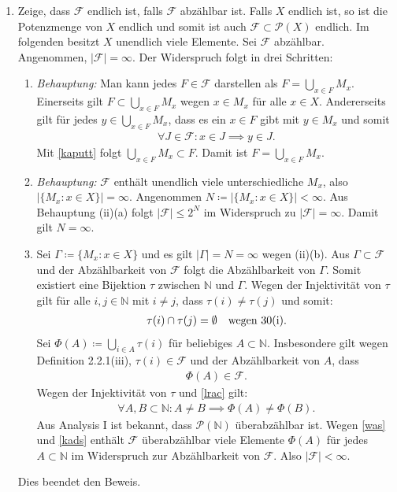 \documentclass[a4paper,DIV=1]{article}
\theoremstyle{plain}
\begin{document}
\begin{enumerate}[label=(\roman*)]
	\item Zeige, dass $\mathcal F$ endlich ist, falls $\mathcal F$ abzählbar ist. Falls $X$ endlich ist, so ist die Potenzmenge von $X$ endlich und somit ist auch $\mathcal F \subset \mathcal P(X)$ endlich. Im folgenden besitzt $X$ unendlich viele Elemente. Sei $\mathcal F$ abzählbar. Angenommen, $|\mathcal F| = \infty$. Der Widerspruch folgt in drei Schritten:
	\begin{enumerate}
		\item \textit{Behauptung:} Man kann jedes $F \in \mathcal F$ darstellen als $F = \bigcup_{x \in F}M_x$. Einerseits gilt $F \subset  \bigcup_{x \in F}M_x$ wegen $x \in M_x$ für alle $x \in X$. Andererseits gilt für jedes $y \in\bigcup_{x \in F} M_x$, dass es ein $x \in F$ gibt mit $y \in M_x$ und somit
		\begin{align}\label{kaputt}
			\forall J \in \mathcal F: x\in J \implies y \in J.
		\end{align}
		Mit \eqref{kaputt} folgt $\bigcup_{x \in F}M_x \subset F$. Damit ist $F = \bigcup_{x \in F}M_x$.
		
		\item \textit{Behauptung:} $\mathcal F$ enthält unendlich viele unterschiedliche $M_x$, also $\vert\{ M_x : x \in X \}\vert = \infty$. Angenommen $N \coloneqq \vert\{ M_x : x \in X \}\vert < \infty$. Aus Behauptung (ii)(a) folgt $|\mathcal F| \leq 2^N$ im Widerspruch zu $|\mathcal F| = \infty$. Damit gilt $N = \infty$.
		
		\item Sei $\Gamma \coloneqq \{ M_x : x \in X \}$ und es gilt $|\Gamma| = N = \infty$ wegen (ii)(b). Aus $\Gamma \subset \mathcal F$ und der Abzählbarkeit von $\mathcal F$ folgt die Abzählbarkeit von $\Gamma$. Somit existiert eine Bijektion $\tau$ zwischen $\mathbb N$ und $\Gamma$. Wegen der Injektivität von $\tau$ gilt für alle $i,j \in \mathbb N$ mit $i \neq j$, dass $\tau(i) \neq \tau(j)$ und somit:
		\begin{align}\label{lrac}
			\tau(i) \cap \tau(j) = \emptyset \quad \text{\text{wegen 30(i)}}.
		\end{align}
		Sei $\Phi(A) \coloneqq \bigcup_{i \in A}\tau(i)$ für beliebiges $A \subset \mathbb N$. Insbesondere gilt wegen Definition 2.2.1(iii), $\tau(i) \in \mathcal F$ und der Abzählbarkeit von $A$, dass
		\begin{align}\label{was}
			\Phi(A) \in \mathcal F.
		\end{align}
		Wegen der Injektivität von $\tau$ und \eqref{lrac} gilt:
		\begin{align}\label{kads}
			\forall A,B \subset \mathbb N: A \neq B \implies \Phi(A) \neq \Phi(B).
		\end{align}
		Aus Analysis I ist bekannt, dass $\mathcal P(\mathbb N)$ überabzählbar ist. Wegen \eqref{was}  und \eqref{kads} enthält $\mathcal F$ überabzählbar viele Elemente $\Phi(A)$ für jedes $A \subset \mathbb N$ im Widerspruch zur Abzählbarkeit von $\mathcal F$. Also $|\mathcal F| < \infty$.
	\end{enumerate}
	Dies beendet den Beweis.
\end{enumerate}
	
\end{document}
